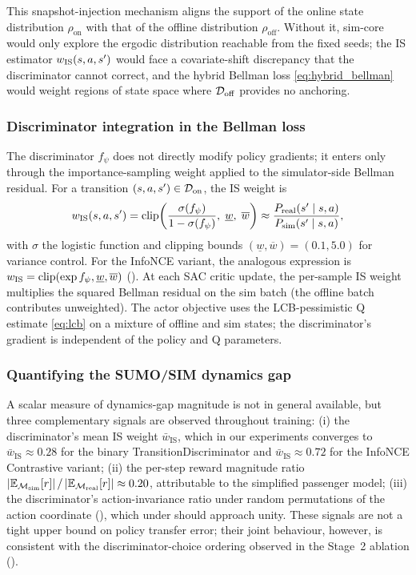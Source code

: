 This snapshot-injection mechanism aligns the support of the online state distribution $\rho_{\text{on}}$ with that of the offline distribution $\rho_{\text{off}}$.
Without it, sim-core would only explore the ergodic distribution reachable from the fixed seeds; the IS estimator $w_{\mathrm{IS}}(s, a, s')$ would face a covariate-shift discrepancy that the discriminator cannot correct, and the hybrid Bellman loss \eqref{eq:hybrid_bellman} would weight regions of state space where $\mathcal{D}_{\mathrm{off}}$ provides no anchoring.

\subsubsection{Discriminator integration in the Bellman loss}
\label{sec:method:disc_role}

The discriminator $f_\psi$ does not directly modify policy gradients; it enters only through the importance-sampling weight applied to the simulator-side Bellman residual.
For a transition $(s, a, s') \in \mathcal{D}_{\mathrm{on}}$, the IS weight is
\begin{equation}
w_{\mathrm{IS}}(s, a, s') = \mathrm{clip}\!\left( \frac{\sigma(f_\psi)}{1 - \sigma(f_\psi)},\; \underline{w},\; \overline{w} \right) \approx \frac{P_{\mathrm{real}}(s' \mid s, a)}{P_{\mathrm{sim}}(s' \mid s, a)},
\label{eq:wis}
\end{equation}
with $\sigma$ the logistic function and clipping bounds $(\underline{w}, \overline{w}) = (0.1, 5.0)$ for variance control.
For the InfoNCE variant, the analogous expression is $w_{\mathrm{IS}} = \mathrm{clip}(\exp f_\psi, \underline{w}, \overline{w})$ ().
At each SAC critic update, the per-sample IS weight multiplies the squared Bellman residual on the sim batch (the offline batch contributes unweighted).
The actor objective uses the LCB-pessimistic Q estimate \eqref{eq:lcb} on a mixture of offline and sim states; the discriminator's gradient is independent of the policy and Q parameters.

\subsubsection{Quantifying the SUMO/SIM dynamics gap}
\label{sec:method:gap}

A scalar measure of dynamics-gap magnitude is not in general available, but three complementary signals are observed throughout training:
(i) the discriminator's mean IS weight $\bar{w}_{\text{IS}}$, which in our experiments converges to $\bar{w}_{\text{IS}} \approx 0.28$ for the binary TransitionDiscriminator and $\bar{w}_{\text{IS}} \approx 0.72$ for the InfoNCE Contrastive variant;
(ii) the per-step reward magnitude ratio $|\mathbb{E}_{\mathcal{M}_{\mathrm{sim}}}[r]|\,/\,|\mathbb{E}_{\mathcal{M}_{\mathrm{real}}}[r]| \approx 0.20$, attributable to the simplified passenger model;
(iii) the discriminator's action-invariance ratio under random permutations of the action coordinate (), which under  should approach unity.
These signals are not a tight upper bound on policy transfer error; their joint behaviour, however, is consistent with the discriminator-choice ordering observed in the Stage~2 ablation ().

